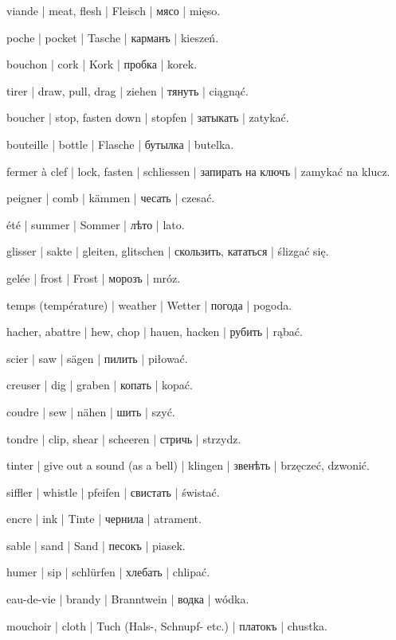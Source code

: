 \begin{ekzvocab}{1em}
 viande | meat, flesh | Fleisch | мясо | mięso.

 poche | pocket | Tasche | карманъ | kieszeń.

 bouchon | cork | Kork | пробка | korek.

 tirer | draw, pull, drag | ziehen | тянуть | ciągnąć.

 boucher | stop, fasten down | stopfen | затыкать | zatykać.

 bouteille | bottle | Flasche | бутылка | butelka.

 fermer à clef | lock, fasten | schliessen | запирать на ключъ | zamykać na klucz.

 peigner | comb | kämmen | чесать | czesać.

 été | summer | Sommer | лѣто | lato.

 glisser | sakte | gleiten, glitschen | скользить, кататься | ślizgać się.

 gelée | frost | Frost | морозъ | mróz.

 temps (température) | weather | Wetter | погода | pogoda.

 hacher, abattre | hew, chop | hauen, hacken | рубить | rąbać.

 scier | saw | sägen | пилить | piłować.

 creuser | dig | graben | копать | kopać.

 coudre | sew | nähen | шить | szyć.

 tondre | clip, shear | scheeren | стричь | strzydz.

 tinter | give out a sound (as a bell) | klingen | звенѣть | brzęczeć, dzwonić.

 siffler | whistle | pfeifen | свистать | świstać.

 encre | ink | Tinte | чернила | atrament.

 sable | sand | Sand | песокъ | piasek.

 humer | sip | schlürfen | хлебать | chlipać.

 eau-de-vie | brandy | Branntwein | водка | wódka.

 mouchoir | cloth | Tuch (Hals-, Schnupf- etc.) | платокъ | chustka.


\end{ekzvocab}
